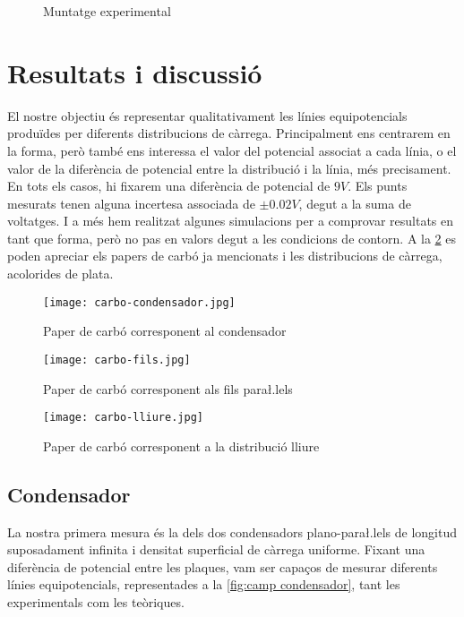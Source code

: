 \begin{figure}[htb]
	\centering
	\caption{Muntatge experimental}
	\label{fig:muntatge}
\end{figure}

\section{Resultats i discussió}
El nostre objectiu és representar qualitativament les línies equipotencials produïdes per diferents distribucions de càrrega. Principalment ens centrarem en la forma, però també ens interessa el valor del potencial associat a cada línia, o el valor de la diferència de potencial entre la distribució i la línia, més precisament. En tots els casos, hi fixarem una diferència de potencial de $9V$. Els punts mesurats tenen alguna incertesa associada de $\pm0.02V$, degut a la suma de voltatges. I a més hem realitzat algunes simulacions per a comprovar resultats en tant que forma, però no pas en valors degut a les condicions de contorn. A la \cref{fig:carbo condensador} es poden apreciar els papers de carbó ja mencionats i les distribucions de càrrega, acolorides de plata.

\begin{figure}[htb]
  \centering
	\texttt{[image: carbo-condensador.jpg]}
  \caption{Paper de carbó corresponent al condensador}
  \label{fig:carbo condensador}
\end{figure}

\begin{figure}[htb]
  \centering
	\texttt{[image: carbo-fils.jpg]}
  \caption{Paper de carbó corresponent als fils para\l.lels}
  \label{fig:carbo fils}
\end{figure}

\begin{figure}[htb]
  \centering
	\texttt{[image: carbo-lliure.jpg]}
  \caption{Paper de carbó corresponent a la distribució lliure}
  \label{fig:carbo lliure}
\end{figure}

\subsection{Condensador}
La nostra primera mesura és la dels dos condensadors plano-para\l.lels de longitud suposadament infinita i densitat superficial de càrrega uniforme. Fixant una diferència de potencial entre les plaques, vam ser capaços de mesurar diferents línies equipotencials, representades a la \cref{fig:camp condensador}, tant les experimentals com les teòriques.

